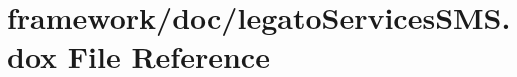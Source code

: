 \hypertarget{legato_services_s_m_s_8dox}{}\section{framework/doc/legato\+Services\+S\+MS.dox File Reference}
\label{legato_services_s_m_s_8dox}
